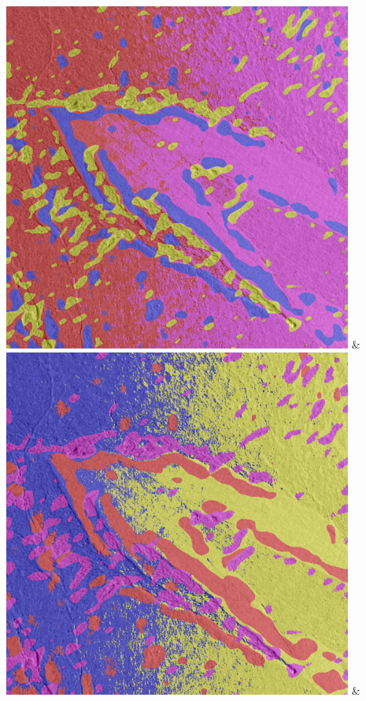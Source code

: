 \begin{table}[h!]
\begin{tabularx}{\textwidth}
		\includegraphics[width=0.9\linewidth]{images/gen/filter_size/p03_03.png_1.00.png} &
		\includegraphics[width=0.9\linewidth]{images/gen/filter_size/p03_03.png_1.25.png} &

\end{tabularx}
\end{table}
